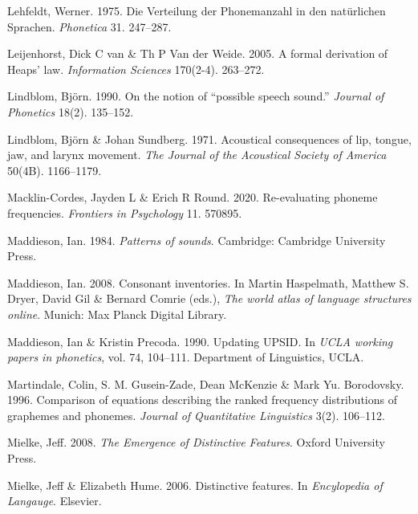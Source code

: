 \documentclass[
]{article}
\newlength{\cslhangindent}
\newlength{\cslentryspacingunit} %
\newenvironment{CSLReferences}[2] %
 {%
  \setlength{\parindent}{0pt}
  \ifodd #1
  \let\oldpar\par
  \def\par{\hangindent=\cslhangindent\oldpar}
  \fi
  \setlength{\parskip}{#2\cslentryspacingunit}
 }%
 {}
\begin{document}
\begin{CSLReferences}{1}{0}
\leavevmode{}%
Lehfeldt, Werner. 1975. {Die Verteilung der Phonemanzahl in den
nat{ü}rlichen Sprachen}. \emph{Phonetica} 31. 247--287.

\leavevmode{}%
Leijenhorst, Dick C van \& Th P Van der Weide. 2005. A formal derivation
of {Heaps'} law. \emph{Information Sciences} 170(2-4). 263--272.

\leavevmode{}%
Lindblom, Björn. 1990. On the notion of {``possible speech sound.''}
\emph{Journal of Phonetics} 18(2). 135--152.

\leavevmode{}%
Lindblom, Björn \& Johan Sundberg. 1971. Acoustical consequences of lip,
tongue, jaw, and larynx movement. \emph{The Journal of the Acoustical
Society of America} 50(4B). 1166--1179.

\leavevmode{}%
Macklin-Cordes, Jayden L \& Erich R Round. 2020. Re-evaluating phoneme
frequencies. \emph{Frontiers in Psychology} 11. 570895.

\leavevmode{}%
Maddieson, Ian. 1984. \emph{Patterns of sounds}. Cambridge: Cambridge
University Press.

\leavevmode{}%
Maddieson, Ian. 2008. Consonant inventories. In Martin Haspelmath,
Matthew S. Dryer, David Gil \& Bernard Comrie (eds.), \emph{The world
atlas of language structures online}. Munich: Max Planck Digital
Library.

\leavevmode{}%
Maddieson, Ian \& Kristin Precoda. 1990. {Updating UPSID}. In \emph{UCLA
working papers in phonetics}, vol. 74, 104--111. Department of
Linguistics, UCLA.

\leavevmode{}%
Martindale, Colin, S. M. Gusein-Zade, Dean McKenzie \& Mark Yu.
Borodovsky. 1996. Comparison of equations describing the ranked
frequency distributions of graphemes and phonemes. \emph{Journal of
Quantitative Linguistics} 3(2). 106--112.

\leavevmode{}%
Mielke, Jeff. 2008. \emph{{The Emergence of Distinctive Features}}.
Oxford University Press.

\leavevmode{}%
Mielke, Jeff \& Elizabeth Hume. 2006. Distinctive features. In
\emph{{Encylopedia of Langauge}}. Elsevier.


\end{CSLReferences}
\end{document}
